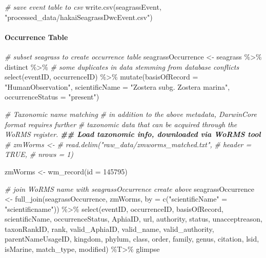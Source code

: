 \documentclass[
]{book}
\newenvironment{Shaded}{\begin{snugshade}}{\end{snugshade}}
\newcommand{\AttributeTok}[1]{\textcolor[rgb]{0.77,0.63,0.00}{#1}}
\newcommand{\CommentTok}[1]{\textcolor[rgb]{0.56,0.35,0.01}{\textit{#1}}}
\newcommand{\DecValTok}[1]{\textcolor[rgb]{0.00,0.00,0.81}{#1}}
\newcommand{\DocumentationTok}[1]{\textcolor[rgb]{0.56,0.35,0.01}{\textbf{\textit{#1}}}}
\newcommand{\FunctionTok}[1]{\textcolor[rgb]{0.00,0.00,0.00}{#1}}
\newcommand{\NormalTok}[1]{#1}
\newcommand{\OtherTok}[1]{\textcolor[rgb]{0.56,0.35,0.01}{#1}}
\newcommand{\SpecialCharTok}[1]{\textcolor[rgb]{0.00,0.00,0.00}{#1}}
\newcommand{\StringTok}[1]{\textcolor[rgb]{0.31,0.60,0.02}{#1}}
\begin{document}
\begin{Shaded}
\begin{Highlighting}[]
\CommentTok{\# save event table to csv}
\FunctionTok{write.csv}\NormalTok{(seagrassEvent, }\StringTok{"processed\_data/hakaiSeagrassDwcEvent.csv"}\NormalTok{)}
\end{Highlighting}
\end{Shaded}

\hypertarget{occurrence-table}{%
\paragraph{Occurrence Table}\label{occurrence-table}}

\begin{Shaded}
\begin{Highlighting}[]
\CommentTok{\# subset seagrass to create occurrence table}
\NormalTok{seagrassOccurrence }\OtherTok{\textless{}{-}}
\NormalTok{  seagrass }\SpecialCharTok{\%\textgreater{}\%}
\NormalTok{  distinct }\SpecialCharTok{\%\textgreater{}\%}  \CommentTok{\# some duplicates in data stemming from database conflicts}
  \FunctionTok{select}\NormalTok{(eventID, occurrenceID) }\SpecialCharTok{\%\textgreater{}\%}
  \FunctionTok{mutate}\NormalTok{(}\AttributeTok{basisOfRecord =} \StringTok{"HumanObservation"}\NormalTok{,}
         \AttributeTok{scientificName   =} \StringTok{"Zostera subg. Zostera marina"}\NormalTok{,}
         \AttributeTok{occurrenceStatus =} \StringTok{"present"}\NormalTok{)}

\CommentTok{\# Taxonomic name matching}
\CommentTok{\# in addition to the above metadata, DarwinCore format requires further}
\CommentTok{\# taxonomic data that can be acquired through the WoRMS register.}
\DocumentationTok{\#\# Load taxonomic info, downloaded via WoRMS tool}
\CommentTok{\# zmWorms \textless{}{-} }
\CommentTok{\#   read.delim("raw\_data/zmworms\_matched.txt",}
\CommentTok{\#              header = TRUE,}
\CommentTok{\#              nrows  = 1)}

\NormalTok{zmWorms }\OtherTok{\textless{}{-}} \FunctionTok{wm\_record}\NormalTok{(}\AttributeTok{id =} \DecValTok{145795}\NormalTok{)}

\CommentTok{\# join WoRMS name with seagrassOccurrence create above}
\NormalTok{seagrassOccurrence }\OtherTok{\textless{}{-}} 
  \FunctionTok{full\_join}\NormalTok{(seagrassOccurrence, zmWorms, }
            \AttributeTok{by =} \FunctionTok{c}\NormalTok{(}\StringTok{"scientificName"} \OtherTok{=} \StringTok{"scientificname"}\NormalTok{)) }\SpecialCharTok{\%\textgreater{}\%}
  \FunctionTok{select}\NormalTok{(eventID, occurrenceID, basisOfRecord, scientificName, occurrenceStatus, AphiaID,}
\NormalTok{         url, authority, status, unacceptreason, taxonRankID, rank,}
\NormalTok{         valid\_AphiaID, valid\_name, valid\_authority, parentNameUsageID,}
\NormalTok{         kingdom, phylum, class, order, family, genus, citation, lsid,}
\NormalTok{         isMarine, match\_type, modified) }\SpecialCharTok{\%T\textgreater{}\%}
\NormalTok{  glimpse}
\end{Highlighting}
\end{Shaded}
\end{document}
